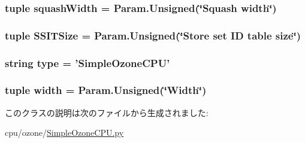 \hypertarget{classSimpleOzoneCPU_1_1SimpleOzoneCPU_a822a947e7bb7034547d91ec80d337303}{
\subsubsection[{squashWidth}]{\setlength{\rightskip}{0pt plus 5cm}tuple {\bf squashWidth} = Param.Unsigned(\char`\"{}Squash {\bf width}\char`\"{})}}
\label{classSimpleOzoneCPU_1_1SimpleOzoneCPU_a822a947e7bb7034547d91ec80d337303}
\hypertarget{classSimpleOzoneCPU_1_1SimpleOzoneCPU_aaae81435109fd5abd8db9e1cac852536}{
\subsubsection[{SSITSize}]{\setlength{\rightskip}{0pt plus 5cm}tuple {\bf SSITSize} = Param.Unsigned(\char`\"{}Store set ID table size\char`\"{})}}
\label{classSimpleOzoneCPU_1_1SimpleOzoneCPU_aaae81435109fd5abd8db9e1cac852536}
\hypertarget{classSimpleOzoneCPU_1_1SimpleOzoneCPU_acce15679d830831b0bbe8ebc2a60b2ca}{
\subsubsection[{type}]{\setlength{\rightskip}{0pt plus 5cm}string {\bf type} = '{\bf SimpleOzoneCPU}'}}
\label{classSimpleOzoneCPU_1_1SimpleOzoneCPU_acce15679d830831b0bbe8ebc2a60b2ca}
\hypertarget{classSimpleOzoneCPU_1_1SimpleOzoneCPU_a397bb3beea7b21f074bc75e1e71f132f}{
\subsubsection[{width}]{\setlength{\rightskip}{0pt plus 5cm}tuple {\bf width} = Param.Unsigned(\char`\"{}Width\char`\"{})}}
\label{classSimpleOzoneCPU_1_1SimpleOzoneCPU_a397bb3beea7b21f074bc75e1e71f132f}


このクラスの説明は次のファイルから生成されました:\begin{DoxyCompactItemize}
\item 
cpu/ozone/\hyperlink{SimpleOzoneCPU_8py}{SimpleOzoneCPU.py}\end{DoxyCompactItemize}
